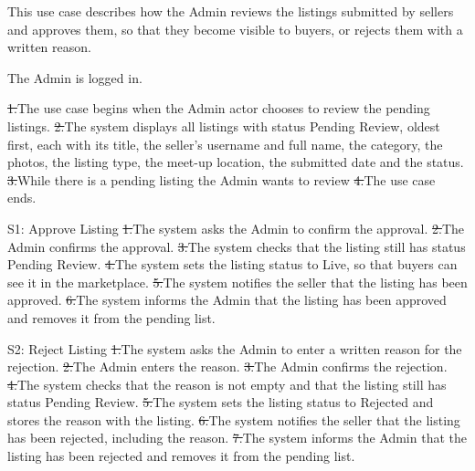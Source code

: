 This use case describes how the Admin reviews the listings submitted by sellers and approves them, so that they become visible to buyers, or rejects them with a written reason.\par
{}
The Admin is logged in.\par
{}
\st{1.}{The use case begins when the Admin actor chooses to review the pending listings.}
\st{2.}{The system displays all listings with status Pending Review, oldest first, each with its title, the seller's username and full name, the category, the photos, the listing type, the meet-up location, the submitted date and the status.}
\st{3.}{While there is a pending listing the Admin wants to review}
\st{4.}{The use case ends.}
\begin{flowblock}{S1: Approve Listing}
\st{1.}{The system asks the Admin to confirm the approval.}
\st{2.}{The Admin confirms the approval.}
\st{3.}{The system checks that the listing still has status Pending Review.}
\st{4.}{The system sets the listing status to Live, so that buyers can see it in the marketplace.}
\st{5.}{The system notifies the seller that the listing has been approved.}
\st{6.}{The system informs the Admin that the listing has been approved and removes it from the pending list.}
\end{flowblock}
\begin{flowblock}{S2: Reject Listing}
\st{1.}{The system asks the Admin to enter a written reason for the rejection.}
\st{2.}{The Admin enters the reason.}
\st{3.}{The Admin confirms the rejection.}
\st{4.}{The system checks that the reason is not empty and that the listing still has status Pending Review.}
\st{5.}{The system sets the listing status to Rejected and stores the reason with the listing.}
\st{6.}{The system notifies the seller that the listing has been rejected, including the reason.}
\st{7.}{The system informs the Admin that the listing has been rejected and removes it from the pending list.}
\end{flowblock}
